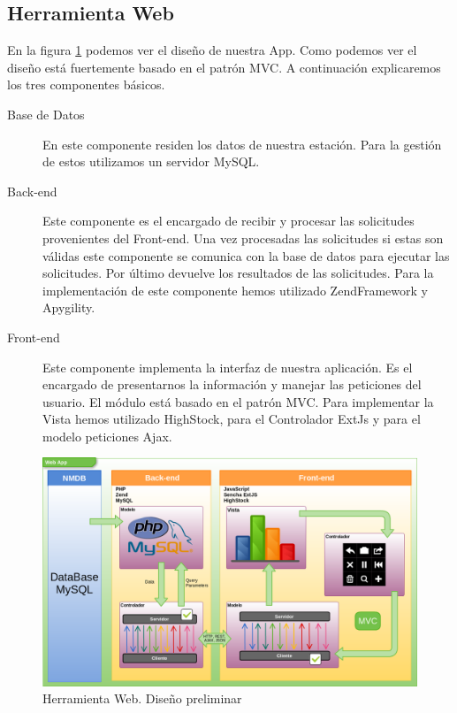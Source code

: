	\subsection{Herramienta Web}
		En la figura \ref{fig:herramienta_web_preliminar} podemos ver el diseño de nuestra App. Como podemos ver el diseño está fuertemente basado en el patrón
		MVC\cite{MVCWiki}. A continuación explicaremos los tres componentes básicos. 
		\begin{description}
		  	\item[Base de Datos]    En este componente residen los datos de nuestra estación. Para la gestión de estos utilizamos un servidor MySQL\cite{MySql}.
			\item[Back-end]    	Este componente es el encargado de recibir y procesar las solicitudes provenientes del Front-end. Una vez procesadas
			  			las solicitudes si estas son válidas este componente se comunica con la base de datos para ejecutar las solicitudes. 
						Por último devuelve los resultados de las solicitudes. Para la implementación de este componente hemos utilizado
						ZendFramework\cite{ZF} y Apygility\cite{Apigility}.  
			\item[Front-end]    	Este componente implementa la interfaz de nuestra aplicación. Es el encargado de presentarnos la información y
			  			manejar las peticiones del usuario. El módulo está basado en el patrón MVC. Para implementar la Vista hemos
						utilizado HighStock\cite{HighStock}, para el Controlador ExtJs\cite{ExtJs} y para el modelo peticiones Ajax\cite{AjaxWiki}.
		\end{description}
		\begin{figure}[h]
			\centering
			\includegraphics[keepaspectratio, width=1\textwidth]{./img/herramienta_web_preliminar.png}
			\caption{Herramienta Web. Diseño preliminar}
			\label{fig:herramienta_web_preliminar}
		\end{figure}
